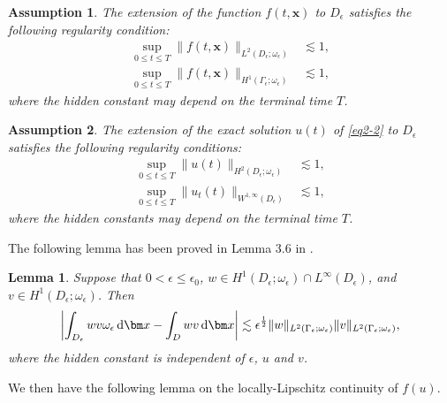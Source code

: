 \documentclass[3p,times]{elsarticle}
\newtheorem{lemma}{Lemma}[section]
\newtheorem{assumption}{Assumption}[section]
\numberwithin{equation}{section}
\newcommand{\dd}{\,{\rm d}}
\begin{document}
\begin{assumption}
	\label{assumption1}
	The extension of the function $f(t,\bm x)$ to $D_{\epsilon}$ satisfies the following regularity condition:
	\begin{subequations}
		\begin{align}
			\label{smooth_cond1}
			\sup\limits_{0\leq t \leq T}\|f(t,\bm x)\|_{L^2(D_{\epsilon};\omega_{\epsilon})} &\lesssim 1,\\
			\label{smooth_cond2}
			\sup\limits_{0\leq t \leq T}\|f(t,\bm x)\|_{H^1(\Gamma_{\epsilon};\omega_{\epsilon})}&\lesssim 1,
		\end{align}
	\end{subequations}
	where the hidden constant may depend on the terminal time $T$.
\end{assumption}
\begin{assumption}
	\label{regularity_assump}
	The extension of the exact solution $u(t)$ of \eqref{eq2-2}   to $D_\epsilon$ satisfies the following regularity conditions:
	\begin{subequations}
		\begin{align}
			\label{regularity1}
			\sup\limits_{0\leq t \leq T}\|u(t)\|_{H^2(D_{\epsilon};\omega_{\epsilon})} &\lesssim 1,\\
			\label{regularity2}
			\sup\limits_{0\leq t \leq T}\|u_t(t)\|_{W^{1,\infty}(D_{\epsilon})}&\lesssim 1,
		\end{align}
	\end{subequations}
	where the hidden constants may depend on the terminal time  $T$.
\end{assumption}


The following lemma has been proved in Lemma 3.6 in \cite{}.
\begin{lemma}
	\label{lemma1}
	Suppose that  $0<\epsilon\leq \epsilon_0$, $w\in H^1(D_{\epsilon};\omega_{\epsilon})\cap L^{\infty}(D_{\epsilon})$, and $v\in H^1(D_{\epsilon};\omega_{\epsilon})$. Then
	\begin{equation*}
		\left|\int_{D_{\epsilon}}w v\omega_{\epsilon}\dd \bm x-\int_D w v\dd \bm x \right|\lesssim \epsilon^{\frac 1 2} \|w\|_{L^2(\Gamma_{\epsilon};\omega_{\epsilon})}\|v\|_{L^2(\Gamma_{\epsilon};\omega_{\epsilon})},
	\end{equation*}
	where the hidden constant  is independent of $\epsilon$, $u$ and $v$.
\end{lemma}

We then have the following lemma on the locally-Lipschitz continuity of $f(u)$.
\end{document}
